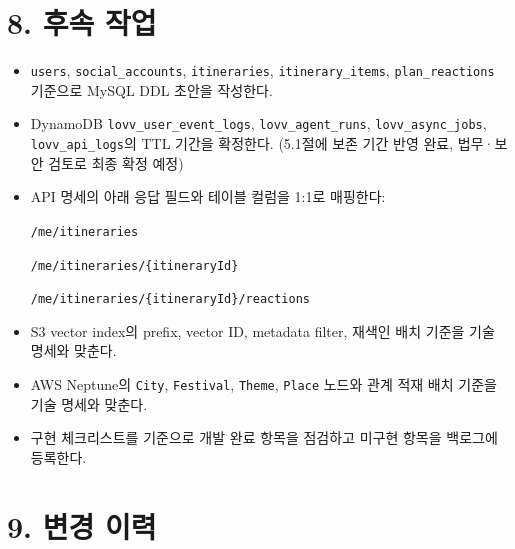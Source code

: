 \documentclass[12pt,a4paper]{article}
\newcommand{\DocNeedspace}[1]{\par\ifdim\dimexpr\pagegoal-\pagetotal\relax<#1\newpage\fi}
\newcommand{\TocNoChildTight}{\vspace{-0.28em}}
\begin{document}
\newpage

\DocNeedspace{10\baselineskip}
\section*{8. 후속 작업}
\addtocontents{toc}{\protect\TocNoChildTight}


\begin{RaggedRight}
\begin{itemize}
\item \texttt{users}, \texttt{social\_\allowbreak{}accounts}, \texttt{itineraries}, \texttt{itinerary\_\allowbreak{}items}, \texttt{plan\_\allowbreak{}reactions} 기준으로 MySQL DDL 초안을 작성한다.
\item DynamoDB \texttt{lovv\_\allowbreak{}user\_\allowbreak{}event\_\allowbreak{}logs}, \texttt{lovv\_\allowbreak{}agent\_\allowbreak{}runs}, \texttt{lovv\_\allowbreak{}async\_\allowbreak{}jobs}, \texttt{lovv\_\allowbreak{}api\_\allowbreak{}logs}의 TTL 기간을 확정한다. (5.1절에 보존 기간 반영 완료, 법무·보안 검토로 최종 확정 예정)
\item API 명세의 아래 응답 필드와 테이블 컬럼을 1:1로 매핑한다:\par
{\footnotesize\texttt{/me/itineraries}\par}
{\footnotesize\texttt{/me/itineraries/\{itineraryId\}}\par}
{\footnotesize\texttt{/me/itineraries/\{itineraryId\}/reactions}\par}
\item S3 vector index의 prefix, vector ID, metadata filter, 재색인 배치 기준을 기술 명세와 맞춘다.
\item AWS Neptune의 \texttt{City}, \texttt{Festival}, \texttt{Theme}, \texttt{Place} 노드와 관계 적재 배치 기준을 기술 명세와 맞춘다.
\item 구현 체크리스트를 기준으로 개발 완료 항목을 점검하고 미구현 항목을 백로그에 등록한다.
\end{itemize}
\end{RaggedRight}


\newpage

\DocNeedspace{10\baselineskip}
\section*{9. 변경 이력}
\addtocontents{toc}{\protect\TocNoChildTight}
\end{document}
